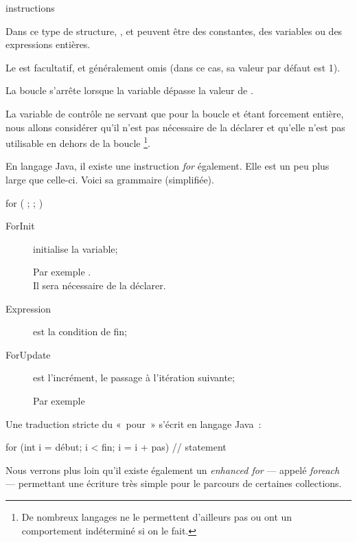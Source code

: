 	\begin{pseudocode}
		\Stmt instructions
	\EndFor
	\end{pseudocode}

	Dans ce type de structure, ,  et  peuvent être des
	constantes, des variables ou des expressions entières. 

	Le  est facultatif, et généralement omis (dans ce cas, sa valeur par
	défaut est 1). 

	La boucle s’arrête lorsque la variable dépasse la valeur de . 

	La variable de contrôle ne servant que pour la boucle et étant forcement
	entière, nous allons considérer qu’il n’est pas nécessaire de la déclarer et
	qu’elle n’est pas utilisable en dehors de la boucle%
	\footnote{%
		De nombreux langages ne le permettent d’ailleurs pas
		ou ont un comportement indéterminé si on le fait.%
	}.

	En langage Java, il existe une instruction \textit{for} également. Elle est
	un peu plus large que celle-ci. Voici sa grammaire (simplifiée).

	\begin{grammaire}
		    for ( ; ; )
	\end{grammaire}

	\begin{description}
		\item[ForInit] initialise la variable;
			
			Par exemple .\\
			Il sera nécessaire de la déclarer.

		\item[Expression] est la condition de fin;

		\item[ForUpdate] est l'incrément, le passage à l'itération suivante;

			Par exemple 
	\end{description}
	
	Une traduction stricte du «~pour~» s'écrit en langage Java~:
	
	\begin{java}
for (int i = début; i < fin; i = i + pas){
	// statement
}
	\end{java}
	
	Nous verrons plus loin qu'il existe également un \textit{enhanced for}
	— appelé \textit{foreach} — permettant une écriture très simple pour le
	parcours de certaines collections. 



